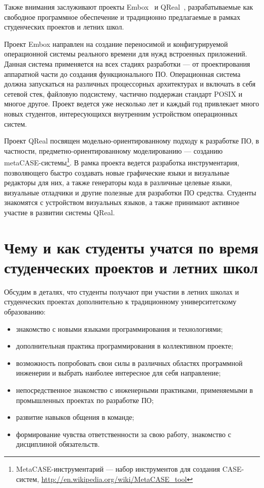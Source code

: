 \documentclass[a4paper]{article}
\begin{document}
Также внимания заслуживают проекты Embox~\cite{embox} и QReal~\cite{qreal2, qreal3, qreal}, разрабатываемые как свободное программное обеспечение и традиционно предлагаемые в рамках студенческих проектов и летних школ. 

Проект Embox направлен на создание переносимой  и конфигурируемой операционной системы реального времени для нужд встроенных приложений. Данная система применяется на всех стадиях разработки --- от проектирования аппаратной части до создания функционального ПО. Операционная система  должна запускаться на различных процессорных архитектурах и включать в себя сетевой стек, файловую подсистему, частично поддержан стандарт POSIX и многое другое. Проект ведется уже несколько лет и каждый год привлекает много новых студентов, интересующихся внутренним устройством операционных систем.  

Проект QReal посвящен модельно-ориентированному подходу к разработке ПО, в частности, предметно-ориентированному моделированию --- созданию metaCASE-системы\footnote{MetaCASE-инструментарий --- набор инструментов для создания CASE-систем, \url{http://en.wikipedia.org/wiki/MetaCASE_tool}}. В рамка проекта ведется разработка инструментария, позволяющего быстро создавать новые графические языки и визуальные редакторы для них, а также генераторы кода в различные целевые языки, визуальные отладчики и другие полезные для разработки ПО средства. Студенты знакомятся с устройством визуальных языков, а также принимают активное участие в развитии системы QReal.

\section{Чему и как студенты учатся по время студенческих проектов и летних школ}

Обсудим в деталях, что студенты получают при участии в летних школах и студенческих проектах дополнительно к традиционному университетскому образованию:

\begin{itemize}
 \item знакомство с новыми языками программирования и технологиями;
 \item дополнительная практика программирования в коллективном проекте;
 \item возможность попробовать свои силы в различных областях программной инженерии и выбрать наиболее интересное для себя направление;
 \item непосредственное знакомство с инженерными практиками, применяемыми в промышленных проектах по разработке ПО;
 \item развитие навыков общения в команде;
 \item формирование чувства ответственности за свою работу, знакомство с дисциплиной обязательств.
\end{itemize}
\end{document}
